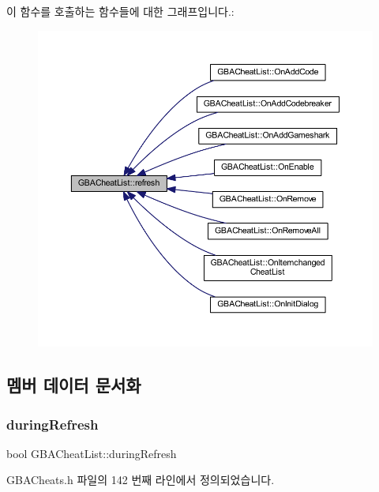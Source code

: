 이 함수를 호출하는 함수들에 대한 그래프입니다.\+:
\nopagebreak
\begin{figure}[H]
\begin{center}
\leavevmode
\includegraphics[width=350pt]{class_g_b_a_cheat_list_a12928bb674926ae02d5a3ceb156a3b53_icgraph}
\end{center}
\end{figure}


\subsection{멤버 데이터 문서화}
\mbox{\label{class_g_b_a_cheat_list_a799afe054e40958158b51a8d79b20b56}} 
\subsubsection{\texorpdfstring{during\+Refresh}{duringRefresh}}
{\footnotesize\ttfamily bool G\+B\+A\+Cheat\+List\+::during\+Refresh}



G\+B\+A\+Cheats.\+h 파일의 142 번째 라인에서 정의되었습니다.

\mbox{\label{class_g_b_a_cheat_list_a00626f69b0783f81eaf76a4483ea76ed}} 
